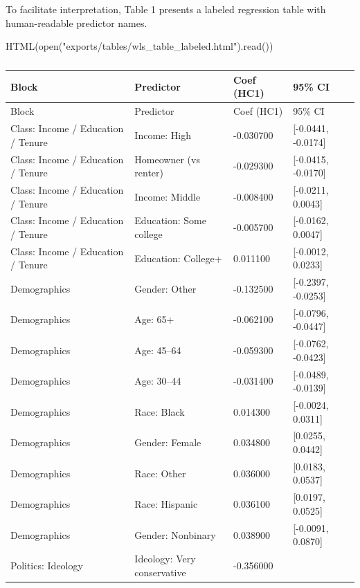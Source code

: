 \documentclass[
  letterpaper,
  DIV=11,
  numbers=noendperiod]{scrartcl}
\newenvironment{Shaded}{\begin{snugshade}}{\end{snugshade}}
\newcommand{\BuiltInTok}[1]{\textcolor[rgb]{0.00,0.23,0.31}{#1}}
\newcommand{\NormalTok}[1]{\textcolor[rgb]{0.00,0.23,0.31}{#1}}
\newcommand{\StringTok}[1]{\textcolor[rgb]{0.13,0.47,0.30}{#1}}
\begin{document}
To facilitate interpretation, Table 1 presents a labeled regression
table with human-readable predictor names.

\begin{Shaded}
\begin{Highlighting}[]
\NormalTok{HTML(}\BuiltInTok{open}\NormalTok{(}\StringTok{"exports/tables/wls\_table\_labeled.html"}\NormalTok{).read())}
\end{Highlighting}
\end{Shaded}

\begin{longtable}[]{@{}llll@{}}
\caption{}\label{T_fad71}\tabularnewline
\toprule\noalign{}
Block & Predictor & Coef (HC1) & 95\% CI \\
\midrule\noalign{}
\endfirsthead
\toprule\noalign{}
Block & Predictor & Coef (HC1) & 95\% CI \\
\midrule\noalign{}
\endhead
\bottomrule\noalign{}
\endlastfoot
Class: Income / Education / Tenure & Income: High & -0.030700 &
{[}-0.0441, -0.0174{]} \\
Class: Income / Education / Tenure & Homeowner (vs renter) & -0.029300 &
{[}-0.0415, -0.0170{]} \\
Class: Income / Education / Tenure & Income: Middle & -0.008400 &
{[}-0.0211, 0.0043{]} \\
Class: Income / Education / Tenure & Education: Some college & -0.005700
& {[}-0.0162, 0.0047{]} \\
Class: Income / Education / Tenure & Education: College+ & 0.011100 &
{[}-0.0012, 0.0233{]} \\
Demographics & Gender: Other & -0.132500 & {[}-0.2397, -0.0253{]} \\
Demographics & Age: 65+ & -0.062100 & {[}-0.0796, -0.0447{]} \\
Demographics & Age: 45--64 & -0.059300 & {[}-0.0762, -0.0423{]} \\
Demographics & Age: 30--44 & -0.031400 & {[}-0.0489, -0.0139{]} \\
Demographics & Race: Black & 0.014300 & {[}-0.0024, 0.0311{]} \\
Demographics & Gender: Female & 0.034800 & {[}0.0255, 0.0442{]} \\
Demographics & Race: Other & 0.036000 & {[}0.0183, 0.0537{]} \\
Demographics & Race: Hispanic & 0.036100 & {[}0.0197, 0.0525{]} \\
Demographics & Gender: Nonbinary & 0.038900 & {[}-0.0091, 0.0870{]} \\
Politics: Ideology & Ideology: Very conservative & -0.356000 &

\end{longtable}
\end{document}
